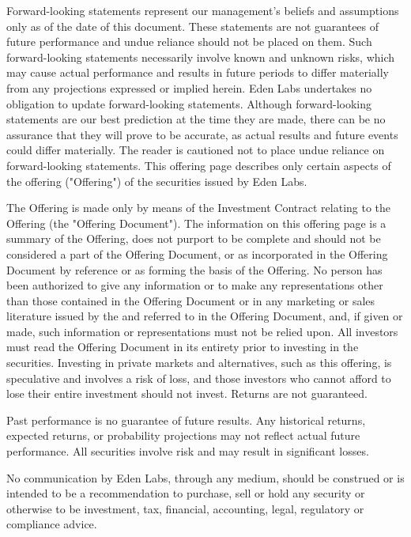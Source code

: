 \begin{flushleft}
    Forward-looking statements represent our management’s beliefs and assumptions only as of the date of this document. These statements are not guarantees of future performance and undue reliance should not be placed on them. Such forward-looking statements necessarily involve known and unknown risks, which may cause actual performance and results in future periods to differ materially from any projections expressed or implied herein. Eden Labs undertakes no obligation to update forward-looking statements. Although forward-looking statements are our best prediction at the time they are made, there can be no assurance that they will prove to be accurate, as actual results and future events could differ materially. The reader is cautioned not to place undue reliance on forward-looking statements. This offering page describes only certain aspects of the offering ("Offering") of the securities issued by Eden Labs. 
    \medskip
    
    The Offering is made only by means of the Investment Contract relating to the Offering (the "Offering Document"). The information on this offering page is a summary of the Offering, does not purport to be complete and should not be considered a part of the Offering Document, or as incorporated in the Offering Document by reference or as forming the basis of the Offering. No person has been authorized to give any information or to make any representations other than those contained in the Offering Document or in any marketing or sales literature issued by the and referred to in the Offering Document, and, if given or made, such information or representations must not be relied upon. All investors must read the Offering Document in its entirety prior to investing in the securities. Investing in private markets and alternatives, such as this offering, is speculative and involves a risk of loss, and those investors who cannot afford to lose their entire investment should not invest. Returns are not guaranteed.
    \medskip

    Past performance is no guarantee of future results. Any historical returns, expected returns, or probability projections may not reflect actual future performance. All securities involve risk and may result in significant losses.
    \medskip

    No communication by Eden Labs, through any medium, should be construed or is intended to be a recommendation to purchase, sell or hold any security or otherwise to be investment, tax, financial, accounting, legal, regulatory or compliance advice. 
    \medskip


\end{flushleft}
